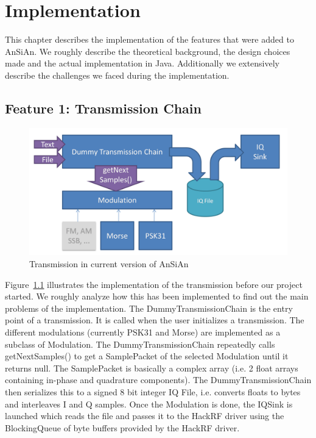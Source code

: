 
\chapter{Implementation}

This chapter describes the implementation of the features that were added to \ac{AnSiAn}. We roughly describe the theoretical background, the design choices made and the actual implementation in Java. Additionally we extensively describe the challenges we faced during the implementation. 

\section{Feature 1: Transmission Chain}


\begin{figure}
	\centering
	\includegraphics[width=1\linewidth]{gfx/TX_chain_step2.png}
	\caption{Transmission in current version of AnSiAn \cite{Mantz2016}}
	\label{fig:tx_chain_old2}
\end{figure}


Figure~\ref{fig:tx_chain_old2} illustrates the implementation of the transmission before our project started. We roughly analyze how this has been implemented to find out the main problems of the implementation. The DummyTransmissionChain is the entry point of a transmission. It is called when the user initializes a transmission. The different modulations (currently PSK31 and Morse) are implemented as a subclass of Modulation. The DummyTransmissionChain repeatedly calls getNextSamples() to get a SamplePacket of the selected Modulation until it returns null. The SamplePacket is basically a complex array (i.e. 2 float arrays containing in-phase and quadrature components). The DummyTransmissionChain then serializes this to a signed 8 bit integer IQ File, i.e. converts floats to bytes and interleaves I and Q samples. Once the Modulation is done, the IQSink is launched which reads the file and passes it to the HackRF driver using the BlockingQueue of byte buffers provided by the HackRF driver. 

